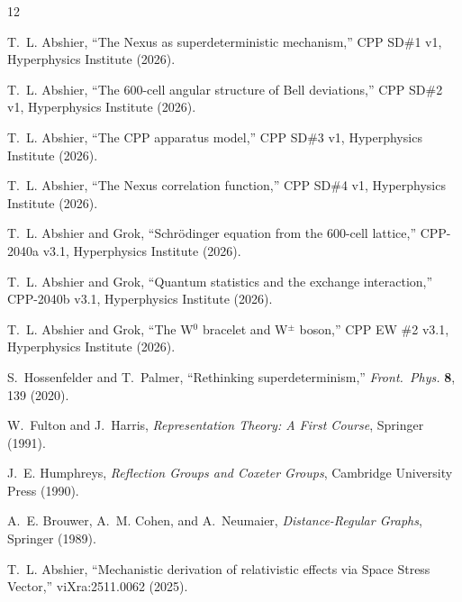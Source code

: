 \documentclass[11pt,a4paper]{article}
\begin{document}

\begin{thebibliography}{12}

T.~L. Abshier,
``The Nexus as superdeterministic mechanism,''
CPP SD\#1 v1, Hyperphysics Institute (2026).

T.~L. Abshier,
``The 600-cell angular structure of Bell deviations,''
CPP SD\#2 v1, Hyperphysics Institute (2026).

T.~L. Abshier,
``The CPP apparatus model,''
CPP SD\#3 v1, Hyperphysics Institute (2026).

T.~L. Abshier,
``The Nexus correlation function,''
CPP SD\#4 v1, Hyperphysics Institute (2026).

T.~L. Abshier and Grok,
``Schrödinger equation from the 600-cell lattice,''
CPP-2040a v3.1, Hyperphysics Institute (2026).

T.~L. Abshier and Grok,
``Quantum statistics and the exchange interaction,''
CPP-2040b v3.1, Hyperphysics Institute (2026).

T.~L. Abshier and Grok,
``The W$^0$ bracelet and W$^\pm$ boson,''
CPP EW \#2 v3.1, Hyperphysics Institute (2026).

S.~Hossenfelder and T.~Palmer,
``Rethinking superdeterminism,''
\textit{Front.\ Phys.} \textbf{8}, 139 (2020).

W.~Fulton and J.~Harris,
\textit{Representation Theory: A First Course},
Springer (1991).

J.~E. Humphreys,
\textit{Reflection Groups and Coxeter Groups},
Cambridge University Press (1990).

A.~E. Brouwer, A.~M. Cohen, and A.~Neumaier,
\textit{Distance-Regular Graphs}, Springer (1989).

T.~L. Abshier,
``Mechanistic derivation of relativistic effects via Space Stress
Vector,'' viXra:2511.0062 (2025).

\end{thebibliography}
\end{document}
